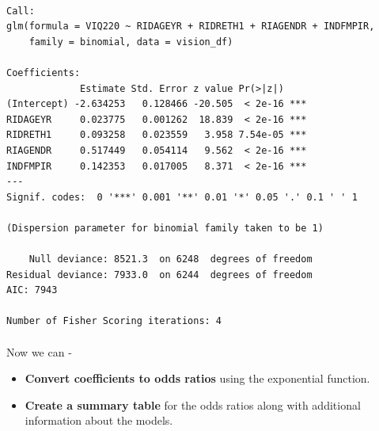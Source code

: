 \documentclass[
  12pt,
]{article}
\makeatletter
\let\oldparagraph\paragraph
\renewcommand{\paragraph}{
    \@ifstar
      \xxxParagraphStar
      \xxxParagraphNoStar
  }
\newcommand{\xxxParagraphStar}[1]{\oldparagraph*{#1}\mbox{}}
\newcommand{\xxxParagraphNoStar}[1]{\oldparagraph{#1}\mbox{}}
\makeatother
\begin{document}
\begin{verbatim}

Call:
glm(formula = VIQ220 ~ RIDAGEYR + RIDRETH1 + RIAGENDR + INDFMPIR, 
    family = binomial, data = vision_df)

Coefficients:
             Estimate Std. Error z value Pr(>|z|)    
(Intercept) -2.634253   0.128466 -20.505  < 2e-16 ***
RIDAGEYR     0.023775   0.001262  18.839  < 2e-16 ***
RIDRETH1     0.093258   0.023559   3.958 7.54e-05 ***
RIAGENDR     0.517449   0.054114   9.562  < 2e-16 ***
INDFMPIR     0.142353   0.017005   8.371  < 2e-16 ***
---
Signif. codes:  0 '***' 0.001 '**' 0.01 '*' 0.05 '.' 0.1 ' ' 1

(Dispersion parameter for binomial family taken to be 1)

    Null deviance: 8521.3  on 6248  degrees of freedom
Residual deviance: 7933.0  on 6244  degrees of freedom
AIC: 7943

Number of Fisher Scoring iterations: 4
\end{verbatim}

\paragraph{Now we can -}\label{now-we-can--}

\begin{itemize}
\item
  \textbf{Convert coefficients to odds ratios} using the exponential
  function.
\item
  \textbf{Create a summary table} for the odds ratios along with
  additional information about the models.
\end{itemize}
\end{document}
